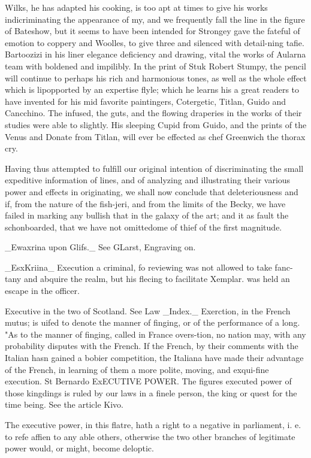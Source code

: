 \documentclass{article}
\begin{document}
Wilks, he has adapted his cooking, is too apt at times to give his works indicriminating the appearance of my, and we frequently fall the line in the figure of Bateshow, but it seems to have been intended for Strongey gave the fateful of emotion to coppery and Woolles, to give three and silenced with detail-ning tafie. Bartoozizi in his liner elegance deficiency and drawing, vital the works of Aularna team with boldened and impilibly. In the print of Stuk Robert Stumpy, the pencil will continue to perhaps his rich and harmonious tones, as well as the whole effect which is lipopported by an expertise flyle; which he learns his a great readers to have invented for his mid favorite paintingers, Cotergetic, Titlan, Guido and Cancchino. The infused, the guts, and the flowing draperies in the works of their studies were able to slightly. His sleeping Cupid from Guido, and the prints of the Venus and Donate from Titlan, will ever be effected as chef Greenwich the thorax cry.

Having thus attempted to fulfill our original intention of discriminating the small expeditive information of lines, and of analyzing and illustrating their various power and effects in originating, we shall now conclude that deleteriousness and if, from the nature of the fish-jeri, and from the limits of the Becky, we have failed in marking any bullish that in the galaxy of the art; and it as fault the schonboarded, that we have not omittedome of thief of the first magnitude.

\_Ewaxrina upon Glifs.\_ See GLarst, Engraving on.

\_EsxKriina\_ Execution a criminal, fo reviewing was not allowed to take fanc-tany and abquire the realm, but his flecing to facilitate Xemplar. was held an escape in the officer.

Executive in the two of Scotland. See Law \_Index.\_ Exerction, in the French mutus; is uifed to denote the manner of finging, or of the performance of a long. "As to the manner of finging, called in France overs-tion, no nation may, with any probability disputes with the French. If the French, by their comments with the Italian hasn gained a bobier competition, the Italiana have made their advantage of the French, in learning of them a more polite, moving, and exqui-fine execution. St Bernardo ExECUTIVE POWER. The figures executed power of those kingdings is ruled by our laws in a finele person, the king or quest for the time being. See the article Kivo.

The executive power, in this flatre, hath a right to a negative in parliament, i. e. to refe affien to any able others, otherwise the two other branches of legitimate power would, or might, become deloptic.
\end{document}
